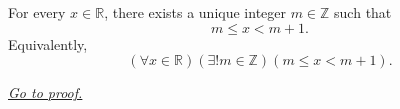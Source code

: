 \begin{lemma}
\label{lem:archimedean-integer-part-lemma}
For every $x\in\mathbb{R}$, there exists a unique integer $m\in\mathbb{Z}$
such that
\[
  m\leq x<m+1.
\]
Equivalently,
\[
  (\forall x\in\mathbb{R})(\exists!m\in\mathbb{Z})(m\leq x<m+1).
\]

\smallskip
\noindent
\hyperref[prf:archimedean-integer-part-lemma]{\textit{Go to proof.}}
\end{lemma}